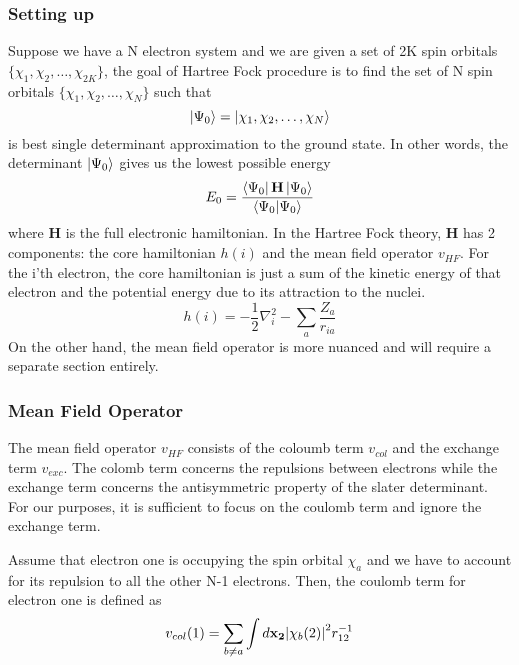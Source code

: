 \documentclass{article}
\begin{document}
        \subsubsection{Setting up}
        Suppose we have a N electron system and we are given a set of 2K spin
        orbitals \(\{\chi_1, \chi_2, \ldots , \chi_{2K}\}\),
        the goal of Hartree Fock procedure is to find the set of N spin orbitals
        \(\{\chi_1, \chi_2, \ldots, \chi_N\}\) such that
        \[\ket{\Psi_0} = \ket{\chi_1, \chi_2, \ldots, \chi_N}\]
        is best single determinant approximation to the ground state. In other
        words, the determinant \(\ket{\Psi_0}\) gives us the lowest possible energy
        \[E_0 = \frac{\bra{\Psi_0}\mathbf{H}\ket{\Psi_0}}{\bra{\Psi_0}\ket{\Psi_0}}\]
        where \textbf{H} is the full electronic hamiltonian. In the Hartree Fock
        theory, \textbf{H} has 2 components: the core hamiltonian \(h(i)\) and the
        mean field operator \(v_{HF}\). For the i'th electron, the core hamiltonian
        is just a sum of the kinetic energy of that electron and the potential energy
        due to its attraction to the nuclei.
        \[h(i) = -\frac{1}{2}\nabla_{i}^{2} - \sum_a \frac{Z_a}{r_{i a}} \]
        On the other hand, the mean field operator is more nuanced and will require
        a separate section entirely.
        \subsubsection{Mean Field Operator}

        The mean field operator \(v_{HF}\) consists of the coloumb term \(v_{col}\)
        and the exchange term \(v_{exc}\). The colomb term concerns the repulsions
        between electrons while the exchange term concerns the antisymmetric
        property of the slater determinant. For our purposes, it is sufficient to
        focus on the coulomb term and ignore the exchange term.

        Assume that electron one is occupying the spin orbital \(\chi_a\) and we
        have to account for its repulsion to all the other N-1 electrons.
        Then, the coulomb term for electron one is defined as
        \[v_{col}(1) = \sum_{b\neq a} \int d\mathbf{x_2} \abs{\chi_b(2)}^2 r_{1 2}^{-1}\]
\end{document}
